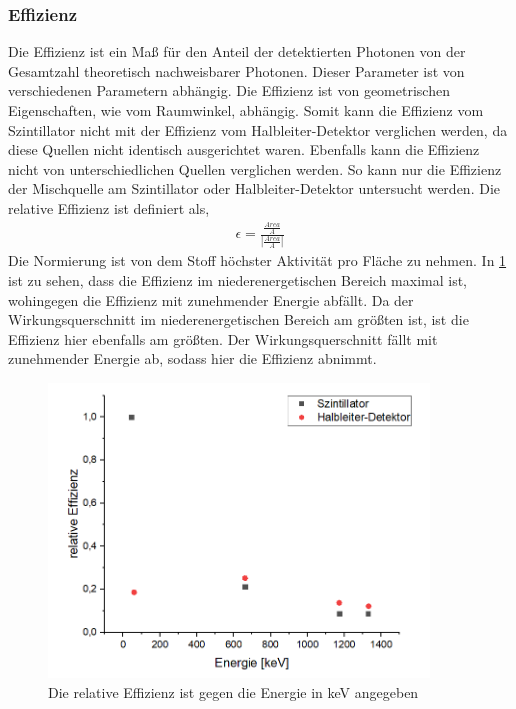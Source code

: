 \subsubsection{Effizienz}
Die Effizienz ist ein Maß für den Anteil der detektierten Photonen von der Gesamtzahl theoretisch nachweisbarer Photonen. Dieser Parameter ist von verschiedenen Parametern abhängig. Die Effizienz ist von geometrischen Eigenschaften, wie vom Raumwinkel, abhängig. Somit kann die Effizienz vom Szintillator nicht mit der Effizienz vom Halbleiter-Detektor verglichen werden, da diese Quellen nicht identisch ausgerichtet waren. Ebenfalls kann die Effizienz nicht von unterschiedlichen Quellen verglichen werden. So kann nur die Effizienz der Mischquelle am Szintillator oder Halbleiter-Detektor untersucht werden. Die relative Effizienz ist definiert als, 
\begin{align}
	\epsilon = \frac{\frac{Area}{A}}{|\frac{Area}{A}|}
\end{align}
Die Normierung ist von dem Stoff höchster Aktivität pro Fläche zu nehmen.
In \cref{eff} ist zu sehen, dass die Effizienz im niederenergetischen Bereich maximal ist, wohingegen die Effizienz mit zunehmender Energie abfällt. Da der Wirkungsquerschnitt im niederenergetischen Bereich am größten ist, ist die Effizienz hier ebenfalls am größten. Der Wirkungsquerschnitt fällt mit zunehmender Energie ab, sodass hier die Effizienz abnimmt.
\begin{figure}[h!]
	\centering
	\includegraphics[width=0.9\textwidth]{Effizienz.png}
	\caption{Die relative Effizienz ist gegen die Energie in keV angegeben}
	\label{eff}
\end{figure}
